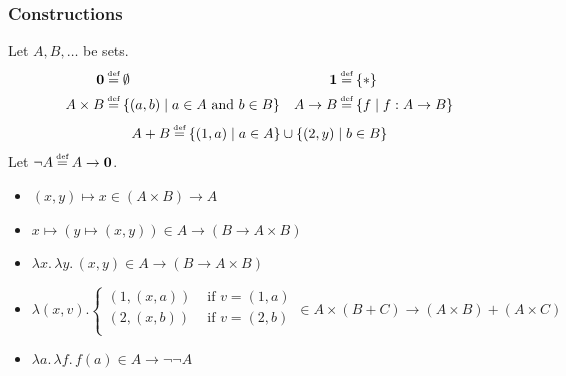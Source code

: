 \documentclass[handout]{beamer} %
\begin{document}
\begin{frame}
\frametitle{Constructions}

Let $A, B, \dots$ be sets.
\begin{align*}
  \mathbf{0} &\defeq \emptyset &
  \mathbf{1} &\defeq \{ \ast \}  \\
  A \times B &\defeq \{ (a, b) \mid a \in A \text{ and } b \in B \} &
  A \to B &\defeq \{ f \mid f : A \to B \}
\end{align*}
\[
  A + B \defeq \{ (1, a) \mid a \in A \} \cup \{ (2, y) \mid b \in B \}
\]
Let $\lnot A \defeq A \to \mathbf{0}$.

\begin{example}
  \small
  \begin{itemize}
    \item $(x, y) \mapsto x \in (A \times B) \to A$
    \item $x \mapsto (y \mapsto (x, y)) \in A \to (B \to A \times B)$
    \item $\lambda x.\, \lambda y.\, (x, y) \in A \to (B \to A \times B)$
    \item $\lambda (x, v). \begin{cases}
        (1, (x, a)) & \text{ if } v = (1, a) \\
        (2, (x, b)) & \text{ if } v = (2, b) \\
    \end{cases}
    \in A \times (B + C) \to (A \times B) + (A \times C)$
    \item $\lambda a.\, \lambda f.\, f(a) \in A \to \lnot\lnot A$
  \end{itemize}
\end{example}

\end{frame}
\end{document}

